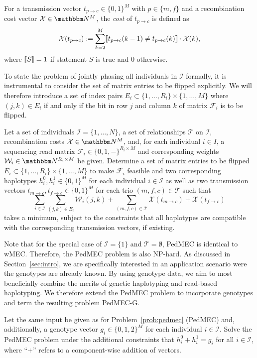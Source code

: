 \begin{definition}
For a transmission vector $t_{p\to c}\in\{0,1\}^M$ with $p\in\{m,f\}$ and a recombination cost vector $\mathcal{X}\in\N^M$, the \emph{cost} of $t_{p\to c}$ is defined as
\[
  \mathcal{X}(t_{p\to c}) := \sum_{k=2}^M\llbracket t_{p\to c}(k-1)\neq t_{p\to c}(k)\rrbracket\cdot\mathcal{X}(k),
\]
where $\llbracket S \rrbracket=1$ if statement $S$ is true and $0$ otherwise.
\end{definition}

To state the problem of jointly phasing all individuals in $\mathcal{I}$ formally, it is instrumental to consider the set of matrix entries to be flipped explicitly.
We will therefore introduce a set of index pairs $E_i \subset \{1,\ldots,R_i\}\times\{1,\ldots,M\}$ where $(j,k)\in E_i$ if and only if the bit in row $j$ and column $k$ of matrix $\mathcal{F}_i$ is to be flipped.

\begin{problem}\label{prob:pedmec}
Let a set of individuals $\mathcal{I}=\{1,\ldots,N\}$, a set of relationships $\mathcal{T}$ on $\mathcal{I}$, recombination costs $\mathcal{X}\in\N^M$, and, for each individual $i\in I$, a sequencing read matrix $\mathcal{F}_i\in\{0,1,-\}^{R_i\times M}$ and corresponding weights $\mathcal{W}_i\in\N^{R_i\times M}$ be given.
Determine a set of matrix entries to be flipped $E_i \subset \{1,\ldots,R_i\}\times\{1,\ldots,M\}$ to make $\mathcal{F}_i$ feasible and two corresponding haplotypes $h_i^0, h_i^1\in\{0,1\}^M$ for each individual $i\in\mathcal{I}$ as well as two transmission vectors $t_{m\to c},t_{f\to c}\in\{0,1\}^M$ for each trio $(m,f,c)\in\mathcal{T}$ such that
\[\sum_{i\in\mathcal{I}}\sum_{(j,k)\in E_i}\mathcal{W}_i(j,k)+\sum_{(m,f,c)\in\mathcal{T}}\mathcal{X}(t_{m\to c}) + \mathcal{X}(t_{f\to c})\]
takes a minimum, subject to the constraints that all haplotypes are compatible with the corresponding transmission vectors, if existing.
\end{problem}

Note that for the special case of $\mathcal{I}=\{1\}$ and $\mathcal{T}=\emptyset$, PedMEC is identical to wMEC.
Therefore, the PedMEC problem is also NP-hard.
As discussed in Section~\ref{sec:intro}, we are specifically interested in an application scenario were the genotypes are already known.
By using genotype data, we aim to most beneficially combine the merits of genetic haplotyping and read-based haplotyping.
We therefore extend the PedMEC problem to incorporate genotypes and term the resulting problem PedMEC-G.
\begin{problem}
Let the same input be given as for Problem~\ref{prob:pedmec} (PedMEC) and, additionally, a genotype vector $g_i\in\{0,1,2\}^M$ for each individual $i\in\mathcal{I}$. Solve the PedMEC problem under the additional constraints that $h^0_i+h^1_i=g_i$ for all $i\in\mathcal{I}$, where ``$+$'' refers to a component-wise addition of vectors.
\end{problem}

